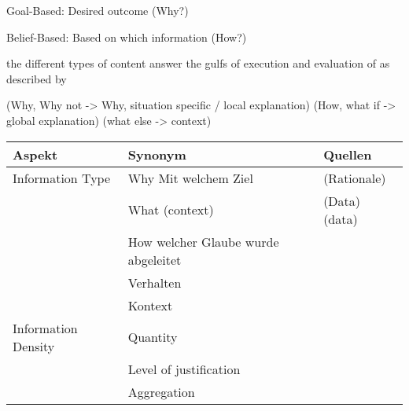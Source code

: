 Goal-Based: Desired outcome (Why?) \cite{kaptein_personalised_2017, abdulrahman_belief-based_2019}

Belief-Based: Based on which information (How?) \cite{kaptein_personalised_2017, abdulrahman_belief-based_2019}

the different types of content answer the gulfs of execution and evaluation of \cite{norman1988psychology} as described by \cite{ribera2019can}

(Why, Why not -> Why, situation specific / local explanation) (How, what if -> global explanation) (what else -> context) \cite{lim_2009_assessing}

\begin{longtable}{|p{}|p{}|p{}|}
    \hline
    \textbf{Aspekt}     & \textbf{Synonym} & \textbf{Quellen} \\ \hline
    Information Type    & Why Mit welchem Ziel & \cite{chazette2020explainability} \cite{abdulrahman_belief-based_2019} \cite{yamada_evaluating_2016} \cite{sato_action-triggering_2019} \cite{zahedi_towards_2019} \cite{zahedi_towards_2019} \cite{zolotas_towards_2019} \cite{cassens_ambient_2019} \cite{thomson_knowledge--information_2020} \cite{chari_explanation_2020} \cite{neerincx_using_2018} \cite{nunes_systematic_2017} (Rationale) \cite{zhu_effects_2020} \cite{ribera2019can} \cite{lim_2009_assessing} \\
                        & What (context) & \cite{chazette2020explainability} \cite{zahedi_towards_2019} \cite{cassens_ambient_2019} \cite{zahedi_towards_2019} \cite{zolotas_towards_2019} \cite{chari_explanation_2020} \cite{nunes_systematic_2017} (Data) \cite{ribera2019can} (data) \\
                        & How welcher Glaube wurde abgeleitet & \cite{chazette2020explainability} \cite{sato_action-triggering_2019} \cite{thomson_knowledge--information_2020} \cite{chari_explanation_2020} \cite{neerincx_using_2018} \cite{lim_2009_assessing} \\
                        & Verhalten & \cite{zhu_effects_2020} \cite{ribera2019can}\\
                        & Kontext &  \\
    \hline
    Information Density & Quantity & \cite{ribera2019can} \cite{kouki_user_2017} \\
                        & Level of justification & \cite{hernandez-bocanegra_effects_2020} \\
                        & Aggregation & \cite{hernandez-bocanegra_effects_2020} \cite{martin_developing_2019} \\

\end{longtable}
